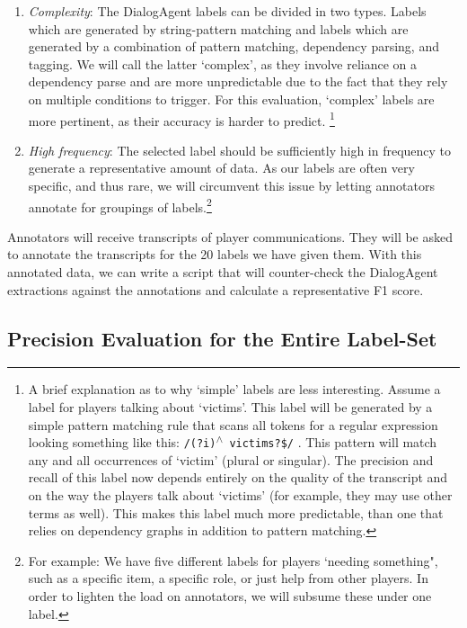 \begin{enumerate}

\item \emph{Complexity}: The DialogAgent labels can be divided in two types. Labels
    which are generated by string-pattern matching and labels which are
    generated by a combination of pattern matching, dependency parsing, and
    tagging. We will call the latter `complex', as they involve reliance on a
    dependency parse and are more unpredictable due to the fact that they rely
    on multiple conditions to trigger. For this evaluation, `complex' labels
    are more pertinent, as their accuracy is harder to predict. \footnote{A
        brief explanation as to why `simple' labels are less interesting.
        Assume a label for players talking about `victims'. This label will be
        generated by a simple pattern matching rule that scans all tokens for a
        regular expression looking something like this: 
               \texttt{/(?i){\textsuperscript{$\wedge$} }victims?\$/}
        .  This pattern will match any and all occurrences of
        `victim' (plural or singular). The precision and recall of this label
        now depends entirely on the quality of the transcript and on the way
        the players talk about `victims' (for example, they may use other
        terms as well). This makes this label much more predictable, than one
        that relies on dependency graphs in addition to pattern matching.}

\item \emph{High frequency}: The selected label should be sufficiently high in
    frequency to generate a representative amount of data. As our labels are
    often very specific, and thus rare, we will circumvent this issue by
    letting annotators annotate for groupings of labels.\footnote{For example:
    We have five different labels for players `needing something", such as a
specific item, a specific role, or just help from other players. In order to
lighten the load on annotators, we will subsume these under one label.}

\end{enumerate}

Annotators will receive transcripts of player communications. They will be
asked to annotate the transcripts for the 20 labels we have given them. With
this annotated data, we can write a script that will counter-check the
DialogAgent extractions against the annotations and calculate a representative
F1 score.

\subsection{Precision Evaluation for the Entire Label-Set}

